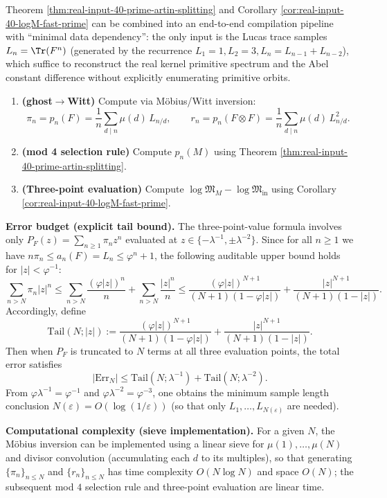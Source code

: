 \begin{remark}\label{rem:real-input-40-lucas-pipeline}
Theorem \ref{thm:real-input-40-prime-artin-splitting} and Corollary \ref{cor:real-input-40-logM-fast-prime} can be combined into an end-to-end compilation pipeline with ``minimal data dependency'': the only input is the Lucas trace samples \(L_n=\Tr(F^n)\) (generated by the recurrence \(L_1=1,L_2=3,L_n=L_{n-1}+L_{n-2}\)), which suffice to reconstruct the real kernel primitive spectrum and the Abel constant difference without explicitly enumerating primitive orbits.
\begin{enumerate}
  \item \textbf{(ghost\(\to\)Witt)} Compute via M\"obius/Witt inversion:
  \[
  \pi_n=p_n(F)=\frac1n\sum_{d\mid n}\mu(d)\,L_{n/d},
  \qquad
  r_n=p_n(F\otimes F)=\frac1n\sum_{d\mid n}\mu(d)\,L_{n/d}^2.
  \]
  \item \textbf{(mod 4 selection rule)} Compute \(p_n(M)\) using Theorem \ref{thm:real-input-40-prime-artin-splitting}.
  \item \textbf{(Three-point evaluation)} Compute
  \(\log\mathfrak{M}_M-\log\mathfrak{M}_{\mathrm{in}}\) using Corollary \ref{cor:real-input-40-logM-fast-prime}.
\end{enumerate}
\par
\textbf{Error budget (explicit tail bound).} The three-point-value formula involves only \(P_F(z)=\sum_{n\ge 1}\pi_n z^n\) evaluated at
\(z\in\{-\lambda^{-1},\pm\lambda^{-2}\}\). Since for all \(n\ge 1\) we have
\(
n\pi_n\le a_n(F)=L_n\le \varphi^n+1
\),
the following auditable upper bound holds for \(|z|<\varphi^{-1}\):
\[
\sum_{n>N}\pi_n|z|^n
\le \sum_{n>N}\frac{(\varphi|z|)^n}{n}+\sum_{n>N}\frac{|z|^n}{n}
\le \frac{(\varphi|z|)^{N+1}}{(N+1)(1-\varphi|z|)}+\frac{|z|^{N+1}}{(N+1)(1-|z|)}.
\]
Accordingly, define
\[
\mathrm{Tail}(N;|z|):=\frac{(\varphi|z|)^{N+1}}{(N+1)(1-\varphi|z|)}+\frac{|z|^{N+1}}{(N+1)(1-|z|)}.
\]
Then when \(P_F\) is truncated to \(N\) terms at all three evaluation points, the total error satisfies
\[
\bigl|\mathrm{Err}_N\bigr|
\le \mathrm{Tail}(N;\lambda^{-1})+\mathrm{Tail}(N;\lambda^{-2}).
\]
From \(\varphi\lambda^{-1}=\varphi^{-1}\) and \(\varphi\lambda^{-2}=\varphi^{-3}\), one obtains the minimum sample length conclusion
\(
N(\varepsilon)=O(\log(1/\varepsilon))
\)
(so that only \(L_1,\dots,L_{N(\varepsilon)}\) are needed).
\par
\textbf{Computational complexity (sieve implementation).} For a given \(N\), the M\"obius inversion can be implemented using a linear sieve for \(\mu(1),\dots,\mu(N)\) and divisor convolution (accumulating each \(d\) to its multiples), so that generating \(\{\pi_n\}_{n\le N}\) and \(\{r_n\}_{n\le N}\) has time complexity \(O(N\log N)\) and space \(O(N)\); the subsequent mod \(4\) selection rule and three-point evaluation are linear time.

\end{remark}
